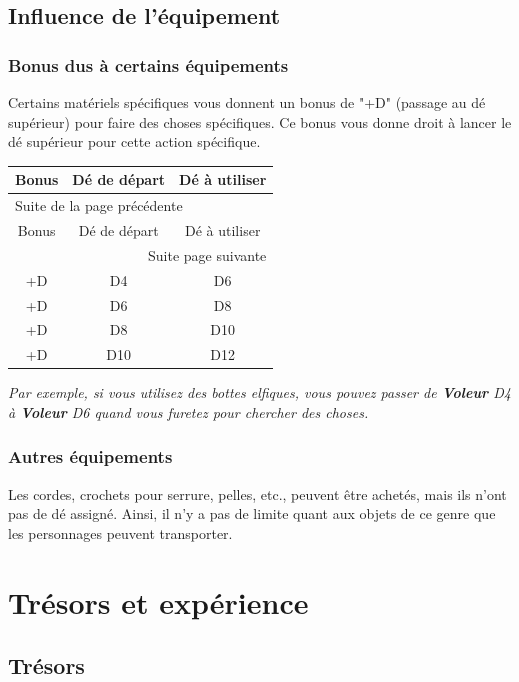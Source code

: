 \documentclass[a4paper, 11pt, twoside]{article}
\begin{document}
\subsection{Influence de l'équipement}
\label{sec:org9f8363c}
\subsubsection{Bonus dus à certains équipements}
\label{sec:org3efbb6d}

Certains matériels spécifiques vous donnent un bonus de "+D" (passage au dé supérieur) pour faire des choses spécifiques. Ce bonus vous donne droit à lancer le dé supérieur pour cette action spécifique.

\begin{longtable}{c|c|c}
Bonus & Dé de départ & Dé à utiliser\\
\hline
\endfirsthead
\multicolumn{3}{l}{Suite de la page précédente} \\
\hline

Bonus & Dé de départ & Dé à utiliser \\

\hline
\endhead
\hline\multicolumn{3}{r}{Suite page suivante} \\
\endfoot
\endlastfoot
\hline
+D & D4 & D6\\
+D & D6 & D8\\
+D & D8 & D10\\
+D & D10 & D12\\
\end{longtable}

\emph{Par exemple, si vous utilisez des bottes elfiques, vous pouvez passer de \textbf{Voleur} D4 à \textbf{Voleur} D6 quand vous furetez pour chercher des choses.}

\subsubsection{Autres équipements}
\label{sec:org9f5c86a}

Les cordes, crochets pour serrure, pelles, etc., peuvent être achetés, mais ils n'ont pas de dé assigné. Ainsi, il n'y a pas de limite quant aux objets de ce genre que les personnages peuvent transporter.

\section{Trésors et expérience}
\label{sec:org003c843}
\subsection{Trésors}
\label{sec:org16760dd}
\end{document}
